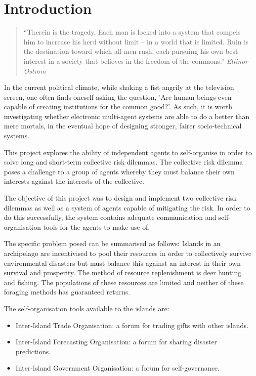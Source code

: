 \chapter{Introduction}

\begin{flushleft}
\begin{quote}
    ``Therein is the tragedy. Each man is locked into a system that compels him to increase his herd without limit – in a world that is limited. Ruin is the destination toward which all men rush, each pursuing his own best interest in a society that believes in the freedom of the commons.''
    \linebreak
    \emph{Ellinor Ostrom}
\end{quote}
\end{flushleft}

In the current political climate, while shaking a fist angrily at the television screen, one often finds oneself asking the question, 'Are human beings even capable of creating institutions for the common good?'. As such, it is worth investigating whether electronic multi-agent systems are able to do a better than mere mortals, in the eventual hope of designing stronger, fairer socio-technical systems.

This project explores the ability of independent agents to self-organise in order to solve long and short-term collective risk dilemmas. The collective risk dilemma poses a challenge to a group of agents whereby they must balance their own interests against the interests of the collective. 

The objective of this project was to design and implement two collective risk dilemmas as well as a system of agents capable of mitigating the risk. In order to do this successfully, the system contains adequate communication and self-organisation tools for the agents to make use of.

The specific problem posed can be summarised as follows: Islands in an archipelago are incentivised to pool their resources in order to collectively survive environmental disasters but must balance this against an interest in their own survival and prosperity. The method of resource replenishment is deer hunting and fishing. The populations of these resources are limited and neither of these foraging methods has guaranteed returns. 

The self-organisation tools available to the islands are:

\begin{itemize}
    \item Inter-Island Trade Organisation: a forum for trading gifts with other islands.
    \item Inter-Island Forecasting Organisation: a forum for sharing disaster predictions.
    \item Inter-Island Government Organisation: a forum for self-governance.
\end{itemize}
